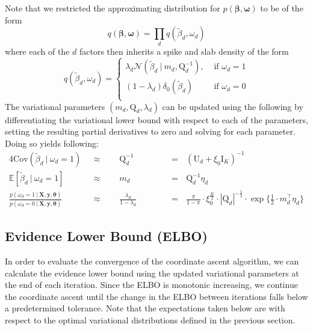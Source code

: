 \documentclass[twoside,11pt]{article}
\newcommand\given[1][]{\:#1\vert\:}
\newcommand{\transpose}[1]{#1^{\intercal}}
\newcommand{\boldbeta}{\boldsymbol\beta}
\newcommand{\E}{\mathbb{E}}
\newcommand{\betad}{\tilde{\beta}_d}
\newcommand{\umat}{\mathrm{U}}
\newcommand{\qmat}{\mathrm{Q}}
\newcommand{\pr}[1]{p \left( #1 \right)}
\begin{document}
Note that we restricted the approximating distribution for $\pr{\boldbeta, \boldsymbol\omega}$ to be of the form
$$ q \left( \boldbeta, \boldsymbol \omega\right) = \prod_{d} q \left( \betad, \omega_d \right) $$
where each of the $d$ factors then inherits a spike and slab density of the form
\[   
q \left( \betad, \omega_d \right) = 
\left\{
\begin{array}{ll}
      \lambda_d \mathcal{N} \left( \betad \given m_d, \qmat_d^{-1} \right),  & \textrm{ if } \omega_d = 1 \\
      (1 - \lambda_d) \delta_0 \left( \betad \right) & \textrm{ if } \omega_d = 0 \\
\end{array} 
\right. \]
The variational parameters $(m_d, \qmat_d, \lambda_d)$ can be updated using the following by differentiating the variational lower bound with respect to each of the parameters, setting the resulting partial derivatives to zero and solving for each parameter. Doing so yields following:
\setlength{\jot}{10pt}
\begin{alignat}{4}
  \mathrm{Cov}(\betad \given \omega_d = 1) \textrm{ } &\approx \textrm{ }&& \qmat_d^{-1} &&\textrm{ } & &= \textrm{ } \left(\umat_d + \xi_0 \mathrm{I}_K\right)^{-1} \label{eq:var_betad}\\
  \E [ \betad \given \omega_d = 1]  \textrm{ }&\approx \textrm{ } && m_d &&\textrm{ }& &= \textrm{ } \qmat_d^{-1} \eta_d  \label{eq:e_betad}\\
  \frac{\pr{\omega_d = 1\given \mathbf{X}, \mathbf{y}, \boldsymbol\theta}}{\pr{\omega_d = 0 \given \mathbf{X}, \mathbf{y}, \boldsymbol\theta}} \textrm{ } &\approx \textrm{ } && \frac{\lambda_d}{1-\lambda_d}&& \textrm{ }& &= \textrm{ } \frac{\pi}{1-\pi} \cdot \xi_0^{\frac{K}{2}} \cdot |\qmat_d|^{-\frac{1}{2}}\cdot \exp\Big\{\frac{1}{2} \cdot \transpose{m_d}\eta_d\Big\} \label{eq:logodds_lambda}
\end{alignat}



\newpage

\subsection{Evidence Lower Bound (ELBO)}
In order to evaluate the convergence of the coordinate ascent algorithm, we can calculate the evidence lower bound using the updated variational parameters at the end of each iteration. Since the ELBO is monotonic increasing, we continue the coordinate ascent until the change in the ELBO between iterations falls below a predetermined tolerance. Note that the expectations taken below are with respect to the optimal variational distributions defined in the previous section.
\end{document}
